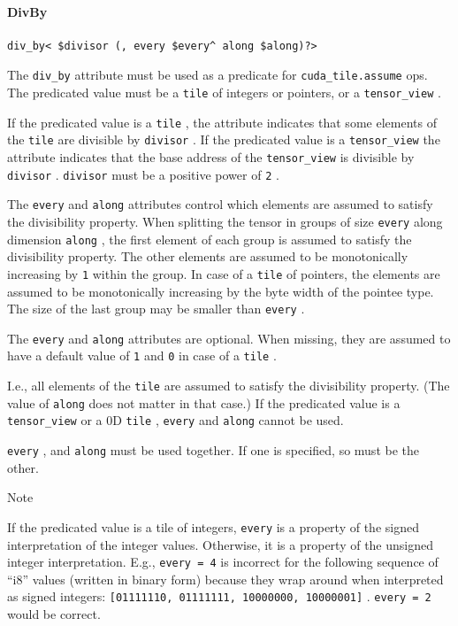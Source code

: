 \documentclass{article}
\begin{document}
\paragraph{DivBy}

\begin{lstlisting}
div_by< $divisor (, every $every^ along $along)?>
\end{lstlisting}

The \texttt{div\_by} attribute must be used as a predicate for \texttt{cuda\_tile.assume} ops. The predicated value must be a \texttt{tile} of integers or pointers, or a \texttt{tensor\_view} .


If the predicated value is a \texttt{tile} , the attribute indicates that some elements of the \texttt{tile} are divisible by \texttt{divisor} . If the predicated value is a \texttt{tensor\_view} the attribute indicates that the base address of the \texttt{tensor\_view} is divisible by \texttt{divisor} . \texttt{divisor} must be a positive power of \texttt{2} .


The \texttt{every} and \texttt{along} attributes control which elements are assumed to satisfy the divisibility property. When splitting the tensor in groups of size \texttt{every} along dimension \texttt{along} , the first element of each group is assumed to satisfy the divisibility property. The other elements are assumed to be monotonically increasing by \texttt{1} within the group. In case of a \texttt{tile} of pointers, the elements are assumed to be monotonically increasing by the byte width of the pointee type. The size of the last group may be smaller than \texttt{every} .


The \texttt{every} and \texttt{along} attributes are optional. When missing, they are assumed to have a default value of \texttt{1} and \texttt{0} in case of a \texttt{tile} .

I.e., all elements of the \texttt{tile} are assumed to satisfy the divisibility property. (The value of \texttt{along} does not matter in that case.) If the predicated value is a \texttt{tensor\_view} or a 0D \texttt{tile} , \texttt{every} and \texttt{along} cannot be used.


\texttt{every} , and \texttt{along} must be used together. If one is specified, so must be the other.


Note


If the predicated value is a tile of integers, \texttt{every} is a property of the signed interpretation of the integer values. Otherwise, it is a property of the unsigned integer interpretation. E.g., \texttt{every = 4} is incorrect for the following sequence of ``i8'' values (written in binary form) because they wrap around when interpreted as signed integers: \texttt{[01111110, 01111111, 10000000, 10000001]} . \texttt{every = 2} would be correct.
\end{document}
